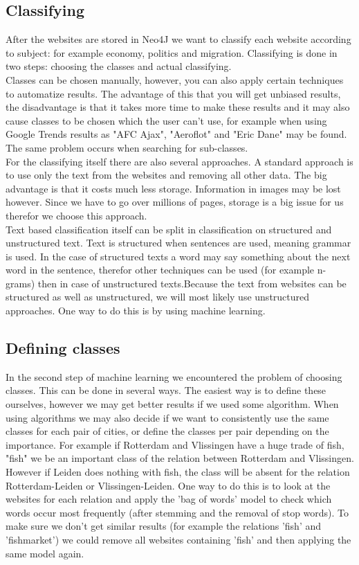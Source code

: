 \subsection{Classifying}
After the websites are stored in Neo4J we want to classify each website according to subject: for example economy, politics and migration. Classifying is done in two steps: choosing the classes and actual classifying. \\
Classes can be chosen manually, however, you can also apply certain techniques to automatize results. The advantage of this that you will get unbiased results, the disadvantage is that it takes more time to make these results and it may also cause classes to be chosen which the user can't use, for example when using Google Trends  \cite{googleTrends}  results as "AFC Ajax", "Aeroflot" and "Eric Dane" may be found. The same problem occurs when searching for sub-classes. \\
For the classifying itself there are also several approaches. A standard approach is to use only the text from the websites and removing all other data. The big advantage is that it costs much less storage. Information in images may be lost however. Since we have to go over millions of pages, storage is a big issue for us therefor we choose this approach. \\
Text based classification itself can be split in classification on structured and unstructured text. Text is structured when sentences are used, meaning grammar is used. In the case of structured texts a word may say something about the next word in the sentence, therefor other techniques can be used (for example n-grams) then in case of unstructured texts.Because the text from websites can be structured as well as unstructured, we will most likely use unstructured approaches. One way to do this is by using machine learning.

\subsection{Defining classes}
In the second step of machine learning we encountered the problem of choosing classes.  This can be done in several ways. The easiest way is to define these ourselves, however we may get better results if we used some algorithm. When using algorithms we may also decide if we want to consistently use the same classes for each pair of cities, or define the classes per pair depending on the importance. For example if Rotterdam and Vlissingen have a huge trade of fish, "fish" we be an important class of the relation between Rotterdam and Vlissingen. However if Leiden does nothing with fish, the class will be absent for the relation Rotterdam-Leiden or Vlissingen-Leiden. One way to do this is to look at the websites for each relation and apply the 'bag of words' model to check which words occur most frequently (after stemming and the removal of stop words). To make sure we don't get similar results (for example the relations 'fish' and 'fishmarket') we could remove all websites containing 'fish' and then applying the same model again.

